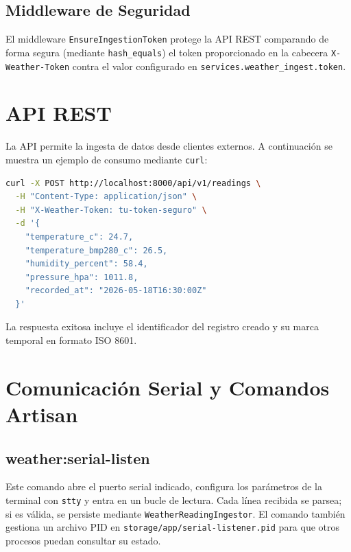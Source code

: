 \documentclass[12pt,a4paper]{report}
\begin{document}
\subsection{Middleware de Seguridad}
\label{subsec:middleware}

El middleware \texttt{EnsureIngestionToken} protege la API REST comparando de forma segura (mediante \texttt{hash\_equals}) el token proporcionado en la cabecera \texttt{X-Weather-Token} contra el valor configurado en \texttt{services.weather\_ingest.token}.

\section{API REST}
\label{sec:api-rest}

La API permite la ingesta de datos desde clientes externos. A continuación se muestra un ejemplo de consumo mediante \texttt{curl}:

\begin{lstlisting}[language=bash, caption={Ejemplo de ingesta por API REST.}]
curl -X POST http://localhost:8000/api/v1/readings \
  -H "Content-Type: application/json" \
  -H "X-Weather-Token: tu-token-seguro" \
  -d '{
    "temperature_c": 24.7,
    "temperature_bmp280_c": 26.5,
    "humidity_percent": 58.4,
    "pressure_hpa": 1011.8,
    "recorded_at": "2026-05-18T16:30:00Z"
  }'
\end{lstlisting}

La respuesta exitosa incluye el identificador del registro creado y su marca temporal en formato ISO 8601.

\section{Comunicación Serial y Comandos Artisan}
\label{sec:comandos-artisan}

\subsection{weather:serial-listen}
\label{subsec:serial-listen}

Este comando abre el puerto serial indicado, configura los parámetros de la terminal con \texttt{stty} y entra en un bucle de lectura. Cada línea recibida se parsea; si es válida, se persiste mediante \texttt{WeatherReadingIngestor}. El comando también gestiona un archivo PID en \texttt{storage/app/serial-listener.pid} para que otros procesos puedan consultar su estado.
\end{document}
